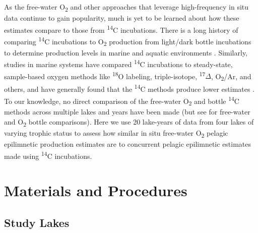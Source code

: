 \documentclass[12pt, oneside]{article}
\begin{document}
As the free-water O\textsubscript{2} and other approaches that leverage high-frequency in situ data continue to gain popularity, much is yet to be learned about how these estimates compare to those from \textsuperscript{14}C incubations. There is a long history of comparing \textsuperscript{14}C incubations to O\textsubscript{2} production from light/dark bottle incubations to determine production levels in marine and aquatic environments \citep{Williams_Heinemann_Marra_Purdie_1983, Bender_Grande_1987, Gazeau_Middelburg_Loijens_Vanderborght_Pizay_Gattuso_2007}. Similarly, studies in marine systems have compared \textsuperscript{14}C incubations to steady-state, sample-based oxygen methods like \textsuperscript{18}O labeling, triple-isotope, \textsuperscript{17}$\Delta$, O\textsubscript{2}/Ar, and others, and have generally found that the \textsuperscript{14}C methods produce lower estimates \citep{juranek_vitro_2005, quayetal2010, Hamme_Cassar_2012,Regaudie_2014}. To our knowledge, no direct comparison of the free-water O\textsubscript{2} and bottle \textsuperscript{14}C methods across multiple lakes and years have been made (but see \citealt{lauster_gross_2006} for free-water and O\textsubscript{2} bottle comparisons). Here we use 20 lake-years of data from four lakes of varying trophic status to assess how similar in situ free-water O\textsubscript{2} pelagic epilimnetic production estimates are to concurrent pelagic epilimnetic estimates made using \textsuperscript{14}C incubations. 

\section*{Materials and Procedures}
\subsection*{Study Lakes} %
\end{document}
